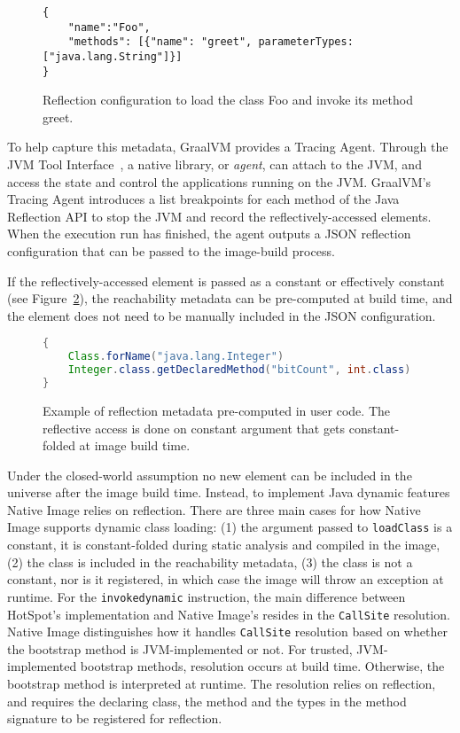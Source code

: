 \begin{figure}[ht]
    \centering
\begin{lstlisting}
{
    "name":"Foo",
    "methods": [{"name": "greet", parameterTypes: ["java.lang.String"]}]
}    
\end{lstlisting}
    \caption{Reflection configuration to load the class Foo and invoke its method greet.}
    \label{fig:reflect_config}
\end{figure}

To help capture this metadata, GraalVM provides a Tracing Agent.  Through the JVM Tool Interface~\cite{noauthor_jvmtm_nodate}, a native library, or \emph{agent}, can attach to the JVM, and access the state and control the applications running on the JVM. GraalVM's Tracing Agent introduces a list breakpoints for each method of the Java Reflection API to stop the JVM and record the reflectively-accessed elements. When the execution run has finished, the agent outputs a JSON reflection configuration that can be passed to the image-build process.   

If the reflectively-accessed element is passed as a constant or effectively constant (see Figure~\ref{fig:computing_reflection_metadata_in_code_code}), the reachability metadata can be pre-computed at build time, and the element does not need to be manually included in the JSON configuration. 

\begin{figure}[ht]
    \centering
\begin{lstlisting}[language=Java]
{
    Class.forName("java.lang.Integer")
    Integer.class.getDeclaredMethod("bitCount", int.class)
}    
\end{lstlisting}
    \caption{Example of reflection metadata pre-computed in user code. The reflective access is done on constant argument that gets constant-folded at image build time.}
    \label{fig:computing_reflection_metadata_in_code_code}
\end{figure}

Under the closed-world assumption no new element can be included in the universe after the image build time. Instead, to implement Java dynamic features Native Image relies on reflection. 
There are three main cases for how Native Image supports dynamic class loading: (1) the argument passed to \verb|loadClass| is a constant, it is constant-folded during static analysis and compiled in the image, (2) the class is included in the reachability metadata, (3) the class is not a constant, nor is it registered, in which case the image will throw an exception at runtime.
For the \verb|invokedynamic| instruction, the main difference between HotSpot's implementation and Native Image's resides in the \verb|CallSite| resolution. Native Image distinguishes how it handles \verb|CallSite| resolution based on whether the bootstrap method is JVM-implemented or not. For trusted, JVM-implemented bootstrap methods, resolution occurs at build time. Otherwise, the bootstrap method is interpreted at runtime. The resolution relies on reflection, and requires the declaring class, the method and the types in the method signature to be registered for reflection.